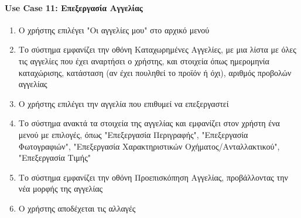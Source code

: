 \documentclass{../ol-softwaremanual}
\begin{document}
	\paragraph{}
	
	
	\paragraph{\en Use Case 11: \gr Επεξεργασία Αγγελίας \gr}
	
	\begin{enumerate}
		\item Ο χρήστης επιλέγει \en"\gr Οι αγγελίες μου\en" \gr στο αρχικό μενού
		\item Το σύστημα εμφανίζει την οθόνη Καταχωρημένες Αγγελίες, με μια λίστα με όλες τις αγγελίες που έχει αναρτήσει ο χρήστης, και στοιχεία όπως ημερομηνία καταχώρισης, κατάσταση (αν έχει πουληθεί το προϊόν ή όχι), αριθμός προβολών αγγελίας
		\item Ο χρήστης επιλέγει την αγγελία που επιθυμεί να επεξεργαστεί
		\item Το σύστημα ανακτά τα στοιχεία της αγγελίας και εμφανίζει στον χρήστη ένα μενού με επιλογές, όπως \en"\gr Επεξεργασία Περιγραφής\en"\gr , \en"\gr Επεξεργασία Φωτογραφιών\en"\gr, \en"\gr Επεξεργασία Χαρακτηριστικών Οχήματος/Ανταλλακτικού\en"\gr, \en"\gr Επεξεργασία Τιμής\en"\gr
		\item Το σύστημα εμφανίζει την οθόνη Προεπισκόπηση Αγγελίας, προβάλλοντας την νέα μορφής της αγγελίας
		\item Ο χρήστης αποδέχεται τις αλλαγές
	\end{enumerate}
	
\end{document}
